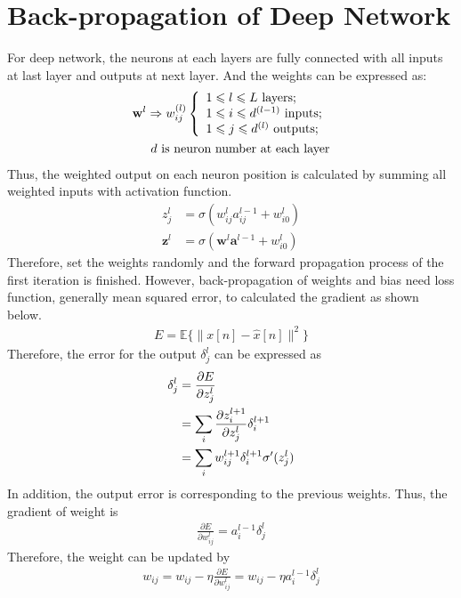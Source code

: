 \section{Back-propagation of Deep Network}
For deep network, the neurons at each layers are fully connected with all inputs at last layer and outputs at next layer. And the weights can be expressed as:
\begin{align}
\mathbf{w}^{l}\Rightarrow w_{ij}^{(l)}\left\{
             \begin{array}{lr}
             1\leqslant l \leqslant L\text{ layers;}\\
             1\leqslant i \leqslant d^{(l-1)}\text{ inputs;} \\
             1\leqslant j \leqslant d^{(l)}\text{ outputs;} \\
             \end{array}
\right.\\
d\text{ is neuron number at each layer}\notag
\end{align}
Thus, the weighted output on each neuron position is calculated by summing all weighted inputs with activation function.
\begin{align}
z_{j}^l &=\sigma(w^l_{ij}a^{l-1}_{ij}+w^l_{i0})\\
\mathbf z^l &=\sigma(\mathbf w^l \mathbf a^{l-1}+w^l_{i0})
\end{align}
Therefore, set the weights randomly and the forward propagation process of the first iteration is finished. However, back-propagation of weights and bias need loss function, generally mean squared error, to calculated the gradient as shown below.
\begin{align}
E=\mathbb {E}\{\|x[n]-\hat x[n]\|^2 \}
\end{align}
Therefore, the error for the output $\delta^l_j$ can be expressed as
\begin{align}
\delta^l_j&=\frac{\partial E}{\partial z^l_j}\notag\\
&=\sum_i\frac{\partial z_i^{l+1}}{\partial z^l_j}\delta_i^{l+1}\notag\\
&=\sum_i w_{ij}^{l+1}\delta^{l+1}_i\sigma'(z^l_j)
\end{align}
In addition, the output error is corresponding to the previous weights. Thus, the gradient of weight is
\begin{align}
\frac{\partial E}{\partial w^l_{ij}}=a_{i}^{l-1}\delta_j^l
\end{align}
Therefore, the weight can be updated by
\begin{align}
w_{ij}=w_{ij}-\eta\frac{\partial E}{\partial w^l_{ij}}=w_{ij}-\eta a_{i}^{l-1}\delta_j^l
\end{align}
